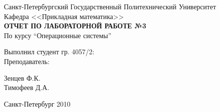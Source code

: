 \begin{titlepage}

\begin{center}

\large Санкт-Петербургский Государственный Политехнический Университет \\
Кафедра <<Прикладная математика>> \\ [8.0cm]
\textbf{\textsc{ОТЧЕТ ПО ЛАБОРАТОРНОЙ РАБОТЕ №3}}\\[1.0cm]
По курсу ``Операционные системы''\\[3.0cm]

\begin{minipage}{0.4\textwidth}
\begin{flushleft} \large
  Выполнил студент гр. 4057/2: \\ [1.0cm]
  Преподаватель:
\end{flushleft}
\end{minipage}
\begin{minipage}{0.4\textwidth}
\begin{flushright} \large
Зенцев Ф.К. \\ [1.0cm]
Тимофеев Д.А.
\end{flushright}
\end{minipage}

\vfill

\large Санкт-Петербург 2010



\end{center}
\end{titlepage}
